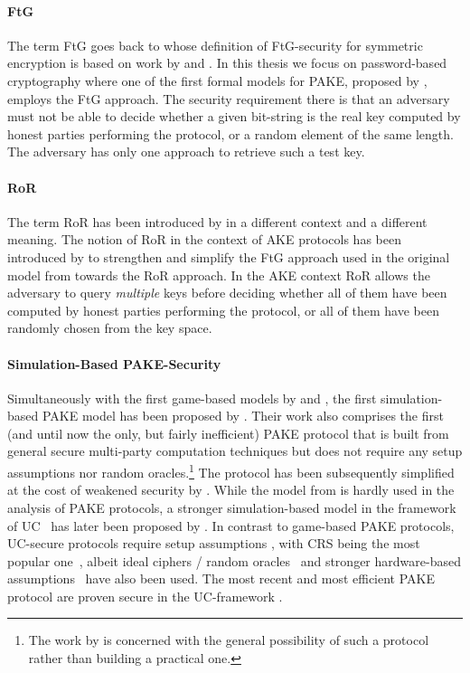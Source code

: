 \paragraph{\acl{FtG}}
The term \acl{FtG} goes back to \citet{Bellare97} whose definition of \ac{FtG}-security for symmetric encryption is based on work by \citet{Goldwasser84} and \citet{Micali86}.
In this thesis we focus on password-based cryptography where one of the first formal models for \ac{PAKE}, proposed by \citet{Bellare2000}, employs the \ac{FtG} approach.
The security requirement there is that an adversary must not be able to decide whether a given bit-string is the real key computed by honest parties performing the protocol, or a random element of the same length.
The adversary has only one approach to retrieve such a test key.

\paragraph{\acl{RoR}}
The term \acl{RoR} has been introduced by \citet{Bellare97} in a different context and a different meaning.
The notion of \ac{RoR} in the context of \acl{AKE} protocols has been introduced by \citet{Abdalla2005} to strengthen and simplify the \ac{FtG} approach used in the original model from \citet{Bellare2000} towards the \ac{RoR} approach.
In the \ac{AKE} context \ac{RoR} allows the adversary to query \emph{multiple} keys before deciding whether all of them have been computed by honest parties performing the protocol, or all of them  have been randomly chosen from the key space.

\paragraph{Simulation-Based \ac{PAKE}-Security}
Simultaneously with the first game-based models by \citet{Bellare2000} and \citet{Boyko2000}, the first simulation-based \ac{PAKE} model has been proposed by \citet{Goldreich01}.
Their work also comprises the first (and until now the only, but fairly inefficient) \ac{PAKE} protocol that is built from general secure multi-party computation techniques but does not require any setup assumptions nor random oracles.\footnote{The work by \citet{Goldreich01} is concerned with the general possibility of such a protocol rather than building a practical one.}
The protocol has been subsequently simplified at the cost of weakened security by \citet{NguyenV04}.
While the model from \citet{Goldreich01} is hardly used in the analysis of \ac{PAKE} protocols, a stronger simulation-based model in the framework of \acl{UC}~\cite{Canetti2001a} has later been proposed by \citet{Canetti2005}.
In contrast to game-based \ac{PAKE} protocols, \ac{UC}-secure protocols require setup assumptions \cite{Canetti2005}, with \ac{CRS} being the most popular one~\cite{Katz2011}, albeit ideal ciphers / random oracles~\cite{Abdalla2008} and stronger hardware-based assumptions~\cite{cryptoeprint:2012:537} have also been used.
The most recent and most efficient \ac{PAKE} protocol are proven secure in the \ac{UC}-framework \cite{Benhamouda2013,AbdallaBBCP13,AbdallaBP14a,AbdallaBP15}.


